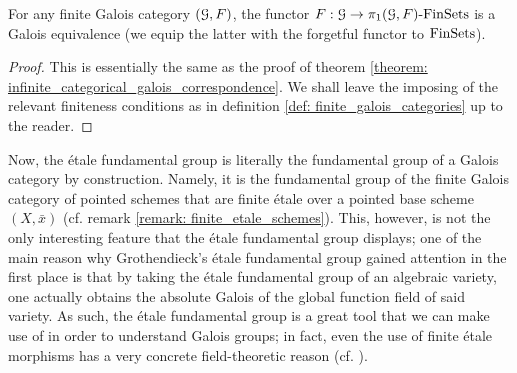                 \begin{theorem} \label{theorem: finite_categorical_galois_correspondence}
                    \cite[\href{https://stacks.math.columbia.edu/tag/0BN4}{Tag 0BN4}]{stacks} For any finite Galois category $(\mathcal{G}, F)$, the functor $F: \mathcal{G} \to \pi_1(\mathcal{G}, F)\text{-}\mathrm{Fin}\mathrm{Sets}$ is a Galois equivalence (we equip the latter with the forgetful functor to $\mathrm{Fin}\mathrm{Sets}$).
                \end{theorem}
                    \begin{proof}
                        This is essentially the same as the proof of theorem \ref{theorem: infinite_categorical_galois_correspondence}. We shall leave the imposing of the relevant finiteness conditions as in definition \ref{def: finite_galois_categories} up to the reader. 
                    \end{proof}
                
                Now, the \'etale fundamental group is literally the fundamental group of a Galois category by construction. Namely, it is the fundamental group of the finite Galois category of pointed schemes that are finite \'etale over a pointed base scheme $(X, \bar{x})$ (cf. remark \ref{remark: finite_etale_schemes}). This, however, is not the only interesting feature that the \'etale fundamental group displays; one of the main reason why Grothendieck's \'etale fundamental group gained attention in the first place is that by taking the \'etale fundamental group of an algebraic variety, one actually obtains the absolute Galois of the global function field of said variety. As such, the \'etale fundamental group is a great tool that we can make use of in order to understand Galois groups; in fact, even the use of finite \'etale morphisms has a very concrete field-theoretic reason (cf. \cite[\href{https://stacks.math.columbia.edu/tag/00U3}{Tag 00U3}]{stacks}).
                
